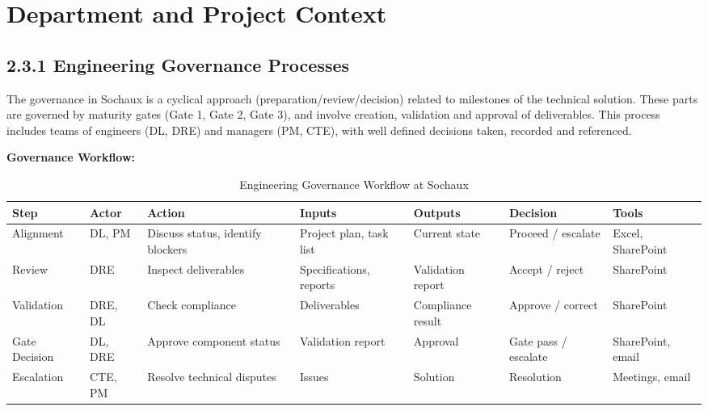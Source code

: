 \section{\textcolor[HTML]{0066CC}{Department and Project Context}}
\label{sec:dept-context}

\subsection*{\textcolor[HTML]{003D99}{2.3.1 Engineering Governance Processes}}

The governance in Sochaux is a cyclical approach (preparation/review/decision) related to milestones of the technical solution. These parts are governed by maturity gates (Gate 1, Gate 2, Gate 3), and involve creation, validation and approval of deliverables. This process includes teams of engineers (DL, DRE) and managers (PM, CTE), with well defined decisions taken, recorded and referenced.
\vspace{0.3cm}

\noindent\textbf{Governance Workflow:}

\begin{table}[!htbp]
\centering
\footnotesize
\setlength{\tabcolsep}{4pt}
\renewcommand{\arraystretch}{1.6}
\caption{Engineering Governance Workflow at Sochaux}
\begin{tabularx}{\textwidth}{|>{\raggedright\arraybackslash}p{1.55cm}|>{\raggedright\arraybackslash}p{1.5cm}|>{\raggedright\arraybackslash}p{2.05cm}|>{\raggedright\arraybackslash}p{2.1cm}|>{\raggedright\arraybackslash}p{1.8cm}|>{\raggedright\arraybackslash}p{1.8cm}|>{\raggedright\arraybackslash}p{1.85cm}|}
\hline
\textcolor[HTML]{003D99}{\textbf{Step}} & \textcolor[HTML]{003D99}{\textbf{Actor}} & \textcolor[HTML]{003D99}{\textbf{Action}} & \textcolor[HTML]{003D99}{\textbf{Inputs}} & \textcolor[HTML]{003D99}{\textbf{Outputs}} & \textcolor[HTML]{003D99}{\textbf{Decision}} & \textcolor[HTML]{003D99}{\textbf{Tools}} \\
\hline
Alignment & DL, PM & Discuss status, identify blockers & Project plan, task list & Current state & Proceed / escalate & Excel, SharePoint \\
\hline
Review & DRE & Inspect deliverables & Specifications, reports & Validation report & Accept / reject & SharePoint \\
\hline
Validation & DRE, DL & Check compliance & Deliverables & Compliance result & Approve / correct & SharePoint \\
\hline
Gate Decision & DL, DRE & Approve component status & Validation report & Approval & Gate pass / escalate & SharePoint, email \\
\hline
Escalation & CTE, PM & Resolve technical disputes & Issues & Solution & Resolution & Meetings, email \\
\hline
\end{tabularx}
\label{tab:governance-workflow}
\end{table}

